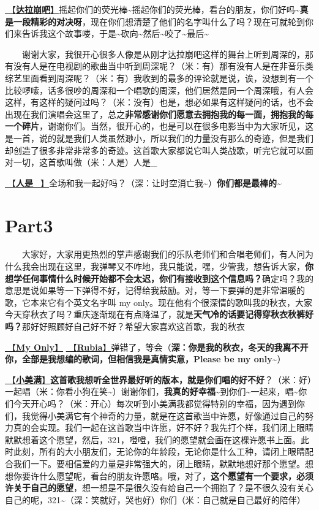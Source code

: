 \documentclass[]{ctexbook}
\begin{document}
\hyperref[dalabengba]{🎵【\textbf{达拉崩吧}】}摇起你们的荧光棒\textasciitilde 摇起你们的荧光棒，看台的朋友，你们好吗\textasciitilde{}\textbf{真是一段精彩的对决呀}，现在你们想清楚了他们的名字叫什么了吗？现在可就轮到你们来告诉我这个故事喽，于是\textasciitilde 砍向\textasciitilde 然后\textasciitilde 咬了\textasciitilde 最后\textasciitilde{}

  谢谢大家，我很开心很多人像是从刚才达拉崩吧这样的舞台上听到周深的，那有没有人是在电视剧的歌曲当中听到周深呢？（米：有）那有没有人是在非音乐类综艺里面看到周深呢？（米：有）我收到的最多的评论就是说，诶，没想到有一个比较啰嗦，话多很吵的周深和一个唱歌的周深，他们居然是同一个周深哦，有人会这样，有这样的疑问过吗？（米：没有）也是，想必如果有这样疑问的话，也不会出现在我们演唱会这里了，总之\textbf{非常感谢你们愿意去拥抱我的每一面，拥抱我的每一个碎片}，谢谢你们。当然，很开心的，也是可以在很多电影当中为大家听见，这是一首，说的就是我们人类虽然渺小，所以我们的力量没有那么的奇迹，但是我们却创造了很多非常非常多的奇迹。这首歌大家都说它叫人类战歌，听完它就可以面对一切，这首歌叫做（米：人是）人是\_

\hyperref[renshi]{🎵【\textbf{人是\_}】}全场和我一起好吗？（深：让时空消亡我\textasciitilde）\textbf{你们都是最棒的\textasciitilde{}}

\section{Part3}\label{chongqing-20241007-part3}

  大家好，大家用更热烈的掌声感谢我们的乐队老师们和合唱老师们，有人问为什么我会出现在这里，我弹琴又不咋地，我只能说，嘿，少管我，想告诉大家，\textbf{你想学任何事情什么时候开始都不会太迟，你们有接收到这个信息吗？}确定吗？我的意思是说如果等一下弹得不好，记得给我鼓励。对，等一下要弹的是非常温暖的歌，它本来它有个英文名字叫 my only。现在他有个很深情的歌叫我的秋衣，大家今天穿秋衣了吗？重庆逐渐现在有点降温了，就是\textbf{天气冷的话要记得穿秋衣秋裤好吗？}那好好照顾好自己好不好？希望大家喜欢这首歌，我的秋衣

\hyperref[my-only]{🎵【\textbf{My Only}】} \hyperref[rubia]{🎵【\textbf{Rubia}】}弹错了，等会（\textbf{深：你是我的秋衣，冬天的我离不开你，全部是我想编的歌词，但相信我是真情实意，Please be my only\textasciitilde{}}）

\hyperref[happy-ending]{🎵【\textbf{小美满}】}\textbf{这首歌我想听全世界最好听的版本，就是你们唱的好不好}？（米：好）一起唱（米：你看小狗在笑\textasciitilde）谢谢你们，\textbf{我真的好幸福\textasciitilde{}}到你们\textasciitilde 一起来，唱\textasciitilde 你们今天开心吗？（米：开心）每次听到小美满我都觉得特别的幸福，因为遇到你们，我觉得小美满它有个神奇的力量，就是在这首歌当中许愿，好像通过自己的努力真的会实现。我们一起在这首歌当中许愿，好不好？我先打个样，我们闭上眼睛默默想着这个愿望，然后，321，噔噔，我们的愿望就会画在这棵许愿书上面。此时此刻，所有的大小朋友们，无论你的年龄段，无论你是什么工种，请闭上眼睛配合我们一下。要相信爱的力量是非常强大的，闭上眼睛，默默地想好那个愿望。想想你要许什么愿望呢，看台的朋友许愿咯。哦，对了，\textbf{这个愿望有一个要求，必须许关于自己的愿望}，想一想是不是很久没有给自己一个拥抱了？是不很久没有关心自己的呢，321\textasciitilde（深：笑就好，哭也好）你们（米：自己就是自己最好的陪伴）
\end{document}
